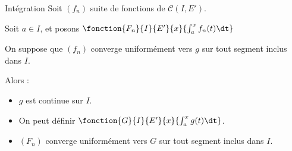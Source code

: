 \begin{theoreme}{Intégration}{}
    Soit $(f_n)$ suite de fonctions de $\mathscr C (I, E')$.

    Soit $a \in I$, et posons $\fonction{F_n}{I}{E'}{x}{\int_a^x f_n(t) \dt}$

    On suppose que $(f_n)$ converge uniformément vers $g$ 
    sur tout segment inclus dans $I$.

    Alors : 
    \begin{itemize}
        \item $g$ est continue sur $I$.
        \item On peut définir $\fonction{G}{I}{E'}{x}{\int_a^x g(t) \dt}$.
        \item $(F_n)$ converge uniformément vers $G$ sur tout segment inclus dans $I$.
    \end{itemize}
\end{theoreme}


